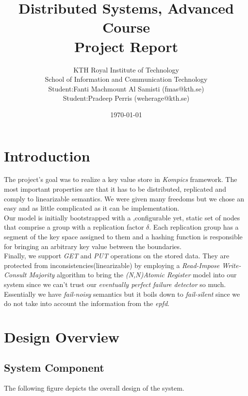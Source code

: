 \documentclass[a4paper, 11pt]{article}
\title{Distributed Systems, Advanced Course \\ 
		Project Report}
\author{KTH Royal Institute of Technology \\ 
	School of Information and Communication Technology \\
	Student:Fanti Machmount Al Samisti (fmas@kth.se) \\
	Student:Pradeep Perris (weherage@kth.se)}
\date{\today{}}
\begin{document}
\maketitle

\tableofcontents

\clearpage

\section{Introduction}

The project's goal was to realize a key value store in \textit{Kompics} framework. The most important properties are that it has to be distributed, replicated and comply to linearizable semantics. We were given many freedoms but we chose an easy and as little complicated as it can be implementation. \\
Our model is initially bootstrapped with a ,configurable yet, static set of nodes that comprise a group with a replication factor $\delta$. Each replication group has a segment of the key space assigned to them and a hashing function is responsible for bringing an arbitrary key value between the boundaries. \\
Finally, we support \textit{GET} and \textit{PUT} operations on the stored data. They are protected from inconsistencies(linearizable) by employing a \textit{Read-Impose Write-Consult Majority} algorithm to bring the \textit{(N,N)Atomic Register} model into our system since we can't trust our \textit{eventually perfect failure detector} so much. Essentially we have \textit{fail-noisy} semantics but it boils down to \textit{fail-silent} since we do not take into account the information from the \textit{epfd}.

\section{Design Overview}

\subsection{System Component}
The following figure depicts the overall design of the system.
\end{document}
